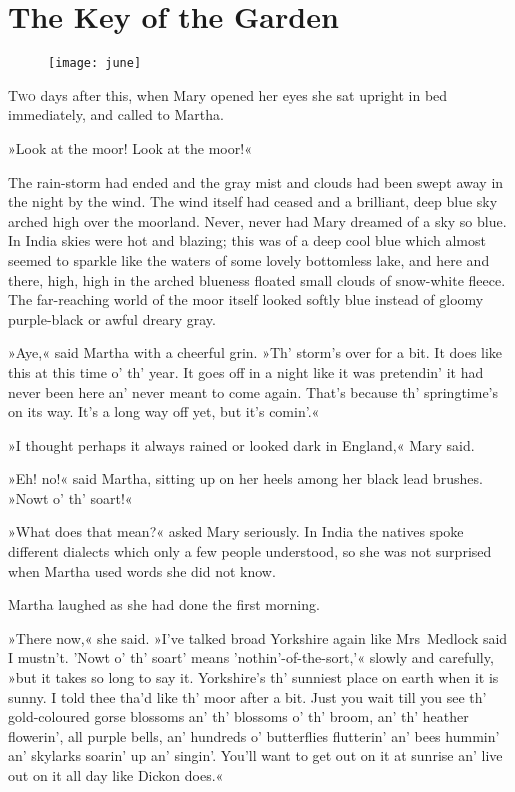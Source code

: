 \chapter{The Key of the Garden} 
	
\begin{figure}[t!]
\centering
\texttt{[image: june]}
\end{figure}

 \lettrine[lines=6]{T}{wo} days after this, when Mary opened her eyes she sat upright in bed immediately, and called to Martha.

\zz
»Look at the moor! Look at the moor!«

\zz
The rain-storm had ended and the gray mist and clouds had been swept away in the night by the wind. The wind itself had ceased and a brilliant, deep blue sky arched high over the moorland. Never, never had Mary dreamed of a sky so blue. In India skies were hot and blazing; this was of a deep cool blue which almost seemed to sparkle like the waters of some lovely bottomless lake, and here and there, high, high in the arched blueness floated small clouds of snow-white fleece. The far-reaching world of the moor itself looked softly blue instead of gloomy purple-black or awful dreary gray.

»Aye,« said Martha with a cheerful grin. »Th' storm's over for a bit. It does like this at this time o' th' year. It goes off in a night like it was pretendin' it had never been here an' never meant to come again. That's because th' springtime's on its way. It's a long way off yet, but it's comin'.«

»I thought perhaps it always rained or looked dark in England,« Mary said.

»Eh! no!« said Martha, sitting up on her heels among her black lead brushes. »Nowt o' th' soart!«

»What does that mean?« asked Mary seriously. In India the natives spoke different dialects which only a few people understood, so she was not surprised when Martha used words she did not know.

Martha laughed as she had done the first morning.

»There now,« she said. »I've talked broad Yorkshire again like Mrs~Medlock said I mustn't. 'Nowt o' th' soart' means 'nothin'-of-the-sort,'« slowly and carefully, »but it takes so long to say it. Yorkshire's th' sunniest place on earth when it is sunny. I told thee tha'd like th' moor after a bit. Just you wait till you see th' gold-coloured gorse blossoms an' th' blossoms o' th' broom, an' th' heather flowerin', all purple bells, an' hundreds o' butterflies flutterin' an' bees hummin' an' skylarks soarin' up an' singin'. You'll want to get out on it at sunrise an' live out on it all day like Dickon does.«

